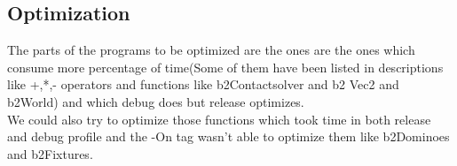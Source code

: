 \documentclass[11pt]{article}
\begin{document}
\subsection{Optimization}
The parts of the programs to be optimized are the ones  are the ones which consume more percentage of time(Some of them have been listed in descriptions like +,*,- operators and functions like b2Contactsolver and b2 Vec2 and b2World) and which debug does but release optimizes. \\
We could also try to optimize those functions which took time in both release and debug profile and the -On tag wasn't able to optimize them
like b2Dominoes and b2Fixtures.
\nocite{halliday}
\nocite{man}
\nocite{iforce2d}
\nocite{stackexchange}

\end{document}
